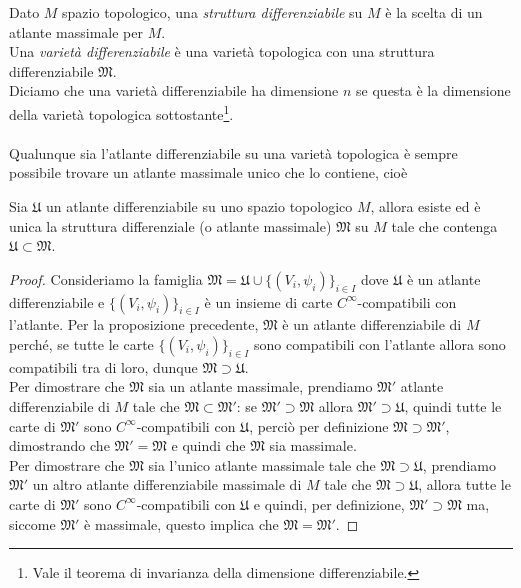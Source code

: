 Dato $ M $ spazio topologico, una \textit{struttura differenziabile} su $ M $ è la scelta di un atlante massimale per $ M $.\\
Una \textit{varietà differenziabile} è una varietà topologica con una struttura differenziabile $ \mathfrak{M} $.\\
Diciamo che una varietà differenziabile ha dimensione $ n $ se questa è la dimensione della varietà topologica sottostante\footnote{%
	Vale il teorema di invarianza della dimensione differenziabile.%
}.\\\\
%
Qualunque sia l'atlante differenziabile su una varietà topologica è sempre possibile trovare un atlante massimale unico che lo contiene, cioè

\begin{definition}
	Sia $ \mathfrak{U} $ un atlante differenziabile su uno spazio topologico $ M $, allora esiste ed è unica la struttura differenziale (o atlante massimale) $ \mathfrak{M} $ su $ M $ tale che contenga $ \mathfrak{U} \subset \mathfrak{M} $.
\end{definition}

\begin{proof}
	Consideriamo la famiglia $ \mathfrak{M} = \mathfrak{U} \cup \{(V_{i},\psi_{i})\}_{i \in I} $ dove $ \mathfrak{U} $ è un atlante differenziabile e $ \{(V_{i},\psi_{i})\}_{i \in I} $ è un insieme di carte $ C^{\infty} $-compatibili con l'atlante. Per la proposizione precedente, $ \mathfrak{M} $ è un atlante differenziabile di $ M $ perché, se tutte le carte $ \{(V_{i},\psi_{i})\}_{i \in I} $ sono compatibili con l'atlante allora sono compatibili tra di loro, dunque $ \mathfrak{M} \supset \mathfrak{U} $.\\
	Per dimostrare che $ \mathfrak{M} $ sia un atlante massimale, prendiamo $ \mathfrak{M}' $ atlante differenziabile di $ M $ tale che $ \mathfrak{M} \subset \mathfrak{M}' $: se $ \mathfrak{M}' \supset \mathfrak{M} $ allora $ \mathfrak{M}' \supset \mathfrak{U} $, quindi tutte le carte di $ \mathfrak{M}' $ sono $ C^{\infty} $-compatibili con $ \mathfrak{U} $, perciò per definizione $ \mathfrak{M} \supset \mathfrak{M}' $, dimostrando che $ \mathfrak{M}' = \mathfrak{M} $ e quindi che $ \mathfrak{M} $ sia massimale.\\
	Per dimostrare che $ \mathfrak{M} $ sia l'unico atlante massimale tale che $ \mathfrak{M} \supset \mathfrak{U} $, prendiamo $ \mathfrak{M}' $ un altro atlante differenziabile massimale di $ M $ tale che $ \mathfrak{M} \supset \mathfrak{U} $, allora tutte le carte di $ \mathfrak{M}' $ sono $ C^{\infty} $-compatibili con $ \mathfrak{U} $ e quindi, per definizione, $ \mathfrak{M}' \supset \mathfrak{M} $ ma, siccome $ \mathfrak{M}' $ è massimale, questo implica che $ \mathfrak{M} = \mathfrak{M}' $.
\end{proof}


